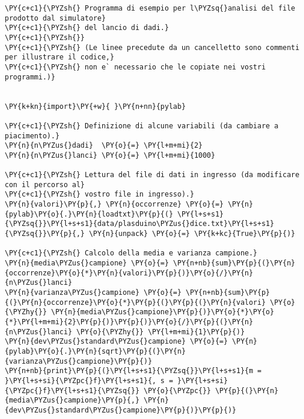 \begin{Verbatim}[label=\makebox{\href{https://github.com/unipi-physics-labs/lab1-sheets/tree/main/snippy/plasduino_dice.py}{https://github.com/.../plasduino\_dice.py}},commandchars=\\\{\}]
\PY{c+c1}{\PYZsh{} Programma di esempio per l\PYZsq{}analisi del file prodotto dal simulatore}
\PY{c+c1}{\PYZsh{} del lancio di dadi.}
\PY{c+c1}{\PYZsh{}}
\PY{c+c1}{\PYZsh{} (Le linee precedute da un cancelletto sono commenti per illustrare il codice,}
\PY{c+c1}{\PYZsh{} non e` necessario che le copiate nei vostri programmi.)}


\PY{k+kn}{import}\PY{+w}{ }\PY{n+nn}{pylab}

\PY{c+c1}{\PYZsh{} Definizione di alcune variabili (da cambiare a piacimento).}
\PY{n}{n\PYZus{}dadi}  \PY{o}{=} \PY{l+m+mi}{2}
\PY{n}{n\PYZus{}lanci} \PY{o}{=} \PY{l+m+mi}{1000}

\PY{c+c1}{\PYZsh{} Lettura del file di dati in ingresso (da modificare con il percorso al}
\PY{c+c1}{\PYZsh{} vostro file in ingresso).}
\PY{n}{valori}\PY{p}{,} \PY{n}{occorrenze} \PY{o}{=} \PY{n}{pylab}\PY{o}{.}\PY{n}{loadtxt}\PY{p}{(} \PY{l+s+s1}{\PYZsq{}}\PY{l+s+s1}{data/plasduino\PYZus{}dice.txt}\PY{l+s+s1}{\PYZsq{}}\PY{p}{,} \PY{n}{unpack} \PY{o}{=} \PY{k+kc}{True}\PY{p}{)}

\PY{c+c1}{\PYZsh{} Calcolo della media e varianza campione.}
\PY{n}{media\PYZus{}campione} \PY{o}{=} \PY{n+nb}{sum}\PY{p}{(}\PY{n}{occorrenze}\PY{o}{*}\PY{n}{valori}\PY{p}{)}\PY{o}{/}\PY{n}{n\PYZus{}lanci}
\PY{n}{varianza\PYZus{}campione} \PY{o}{=} \PY{n+nb}{sum}\PY{p}{(}\PY{n}{occorrenze}\PY{o}{*}\PY{p}{(}\PY{p}{(}\PY{n}{valori} \PY{o}{\PYZhy{}} \PY{n}{media\PYZus{}campione}\PY{p}{)}\PY{o}{*}\PY{o}{*}\PY{l+m+mi}{2}\PY{p}{)}\PY{p}{)}\PY{o}{/}\PY{p}{(}\PY{n}{n\PYZus{}lanci} \PY{o}{\PYZhy{}} \PY{l+m+mi}{1}\PY{p}{)}
\PY{n}{dev\PYZus{}standard\PYZus{}campione} \PY{o}{=} \PY{n}{pylab}\PY{o}{.}\PY{n}{sqrt}\PY{p}{(}\PY{n}{varianza\PYZus{}campione}\PY{p}{)}
\PY{n+nb}{print}\PY{p}{(}\PY{l+s+s1}{\PYZsq{}}\PY{l+s+s1}{m = }\PY{l+s+si}{\PYZpc{}f}\PY{l+s+s1}{, s = }\PY{l+s+si}{\PYZpc{}f}\PY{l+s+s1}{\PYZsq{}} \PY{o}{\PYZpc{}} \PY{p}{(}\PY{n}{media\PYZus{}campione}\PY{p}{,} \PY{n}{dev\PYZus{}standard\PYZus{}campione}\PY{p}{)}\PY{p}{)}


\end{Verbatim}
